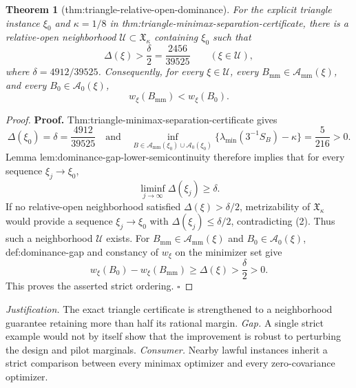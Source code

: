 \documentclass{article}
\newtheorem{theorem}{Theorem}
\begin{document}
\begin{theorem}[thm:triangle-relative-open-dominance]\label{thm:triangle-relative-open-dominance}
For the explicit triangle instance \(\xi_0\) and \(\kappa=1/8\) in thm:triangle-minimax-separation-certificate, there is a relative-open neighborhood \(\mathcal U\subset\mathfrak X_\kappa\) containing \(\xi_0\) such that
\[
\Delta(\xi)>\frac{\delta}{2}=\frac{2456}{39525}
\qquad(\xi\in\mathcal U),
\]
where \(\delta=4912/39525\).  Consequently, for every \(\xi\in\mathcal U\), every \(B_{\mathrm{mm}}\in\mathcal A_{\mathrm{mm}}(\xi)\), and every \(B_0\in\mathcal A_0(\xi)\),
\[
w_\xi(B_{\mathrm{mm}})<w_\xi(B_0).
\]
\end{theorem}
\begin{proof}
\textbf{Proof.}
Thm:triangle-minimax-separation-certificate gives
\[
\Delta(\xi_0)=\delta=\frac{4912}{39525}
\quad\text{and}\quad
\inf_{B\in\mathcal A_{\mathrm{mm}}(\xi_0)\cup\mathcal A_0(\xi_0)}
\{\lambda_{\min}(3^{-1}S_B)-\kappa\}=\frac5{216}>0.
\tag{1}
\]
Lemma lem:dominance-gap-lower-semicontinuity therefore implies that for every sequence \(\xi_j\to\xi_0\),
\[
\liminf_{j\to\infty}\Delta(\xi_j)\ge\delta.
\tag{2}
\]
If no relative-open neighborhood satisfied \(\Delta(\xi)>\delta/2\), metrizability of \(\mathfrak X_\kappa\) would provide a sequence \(\xi_j\to\xi_0\) with \(\Delta(\xi_j)\le\delta/2\), contradicting (2).  Thus such a neighborhood \(\mathcal U\) exists.  For \(B_{\mathrm{mm}}\in\mathcal A_{\mathrm{mm}}(\xi)\) and \(B_0\in\mathcal A_0(\xi)\), def:dominance-gap and constancy of \(w_\xi\) on the minimizer set give
\[
w_\xi(B_0)-w_\xi(B_{\mathrm{mm}})
\ge\Delta(\xi)>\frac\delta2>0.
\]
This proves the asserted strict ordering.  \(\square\)
\end{proof}
\par\smallskip\noindent \textit{Justification.} The exact triangle certificate is strengthened to a neighborhood guarantee retaining more than half its rational margin. \textit{Gap.} A single strict example would not by itself show that the improvement is robust to perturbing the design and pilot marginals. \textit{Consumer.} Nearby lawful instances inherit a strict comparison between every minimax optimizer and every zero-covariance optimizer.
\end{document}
